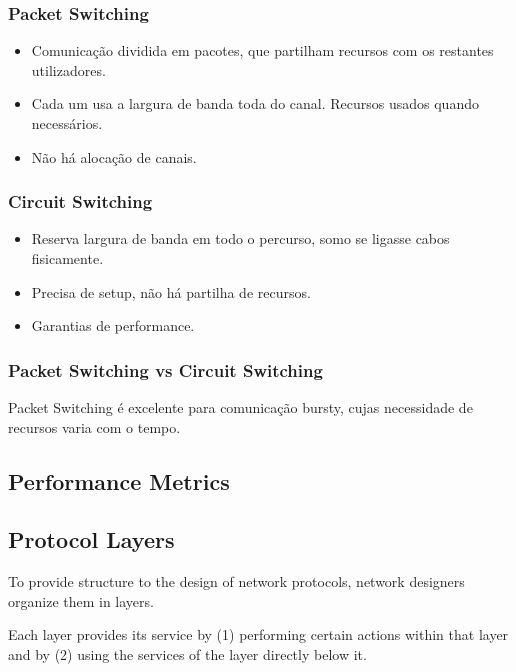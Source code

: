 \documentclass[12pt]{article}
\begin{document}
\subsubsection{Packet Switching}

\begin{itemize}
    \item Comunicação dividida em pacotes, que partilham recursos com os restantes utilizadores.
    \item Cada um usa a largura de banda toda do canal. Recursos usados quando necessários.
    \item Não há alocação de canais.
\end{itemize}

\subsubsection{Circuit Switching}

\begin{itemize}
    \item Reserva largura de banda em todo o percurso, somo se ligasse cabos fisicamente.
    \item Precisa de setup, não há partilha de recursos.
    \item Garantias de performance. 
\end{itemize}

\subsubsection*{Packet Switching vs Circuit Switching}

Packet Switching é excelente para comunicação bursty, cujas necessidade de recursos varia com o tempo.

\subsection{Performance Metrics}

\subsection{Protocol Layers}

To provide structure to the design of network protocols, network designers organize them in layers.

Each layer provides its service by (1) performing certain actions within
that layer and by (2) using the services of the layer directly below it. \\
\end{document}
